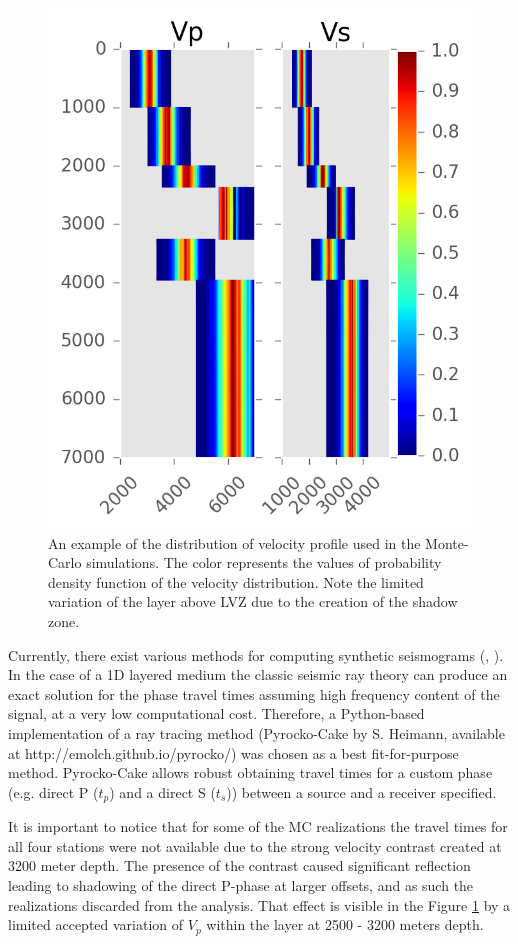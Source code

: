 \begin{figure}[htb]
\begin{center}
\includegraphics[width=0.7\linewidth,angle=0]{./AntonBiryukov_bibtex/VpVs.png}
\end{center}
\vspace{-4mm}
\caption{An example of the distribution of velocity profile used in the Monte-Carlo simulations. The color represents the values of probability density function of the velocity distribution. Note the limited variation of the layer above LVZ due to the creation of the shadow zone.}
\label{fig:vpvs}
\end{figure}

Currently, there exist various methods for computing synthetic seismograms (\citet{kennett_seismic_2001}, \citet{chapman_fundamentals_2004}). In the case of a 1D layered medium the classic seismic ray theory can produce an exact solution for the phase travel times assuming high frequency content of the signal, at a very low computational cost. Therefore, a Python-based implementation of a ray tracing method (Pyrocko-Cake by S. Heimann, available at http://emolch.github.io/pyrocko/) was chosen as a best fit-for-purpose method. Pyrocko-Cake allows robust obtaining travel times for a custom phase (e.g. direct P ($t_{p}$) and a direct S ($t_{s}$)) between a source and a receiver specified.


It is important to notice that for some of the MC realizations the travel times for all four stations were not available due to the strong velocity contrast created at 3200 meter depth. The presence of the contrast caused significant reflection leading to shadowing of the direct P-phase at larger offsets, and as such the realizations  discarded from the analysis. That effect is visible in the Figure \ref{fig:vpvs} by a limited accepted variation of $V_{p}$ within the layer at 2500 - 3200 meters depth.

